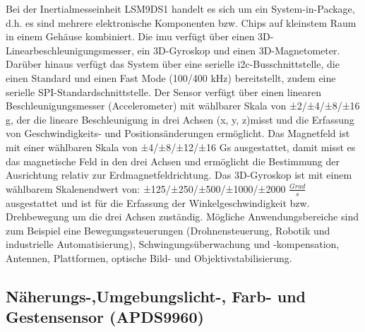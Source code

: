 Bei der Inertialmesseinheit LSM9DS1 handelt es sich um ein System-in-Package, d.h. es sind mehrere elektronische Komponenten bzw. Chips auf kleinstem Raum in einem Gehäuse kombiniert.\cite{Lienig.2012} Die \ac{imu} verfügt über einen 3D-Linearbeschleunigungsmesser, ein 3D-Gyroskop und einen 3D-Magnetometer. Darüber hinaus verfügt das System über eine serielle \ac{i2c}-Busschnittstelle, die einen Standard und einen Fast Mode (100/400 kHz) bereitstellt, zudem eine serielle SPI-Standardschnittstelle. Der Sensor verfügt über einen linearen Beschleunigungsmesser (Accelerometer) mit wählbarer Skala von ±2/±4/±8/±16 g, der die lineare Beschleunigung in drei Achsen (x, y, z)misst und die Erfassung von Geschwindigkeits- und Positionsänderungen ermöglicht. Das Magnetfeld ist mit einer wählbaren Skala von ±4/±8/±12/±16 Gs ausgestattet, damit misst es das magnetische Feld in den drei Achsen und ermöglicht die Bestimmung der Ausrichtung relativ zur Erdmagnetfeldrichtung. Das 3D-Gyroskop ist mit einem wählbarem Skalenendwert von: ±125/±250/±500/±1000/±2000 $\frac{Grad}{s}$ ausgestattet und ist für die Erfassung der Winkelgeschwindigkeit bzw. Drehbewegung um die drei Achsen zuständig.\cite{STM1.2015}\cite{Ard.2024}
Mögliche Anwendungsbereiche sind zum Beispiel eine Bewegungssteuerungen (Drohnensteuerung, Robotik und industrielle Automatisierung), Schwingungsüberwachung und -kompensation, Antennen, Plattformen, optische Bild- und Objektivstabilisierung.  

\subsection{Näherungs-,Umgebungslicht-, Farb- und Gestensensor (APDS9960)}

